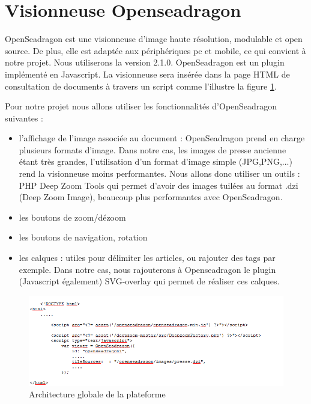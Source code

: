 \newpage
\section{Visionneuse Openseadragon}
\label{sec:seadragon}
OpenSeadragon est une visionneuse d’image haute résolution, modulable et open source. De plus, elle est adaptée aux périphériques pc et mobile, ce qui convient à notre projet. Nous utiliserons la version 2.1.0. OpenSeadragon est un plugin implémenté en Javascript. La visionneuse sera insérée dans la page HTML de consultation de documents à travers un script comme l'illustre la figure \ref{seadragon}. 

Pour notre projet nous allons utiliser les fonctionnalités d'OpenSeadragon suivantes : 
\begin{itemize}
	\item l'affichage de l'image associée au document : OpenSeadragon prend en charge plusieurs formats d'image. Dans notre cas, les images de presse ancienne étant très grandes, l'utilisation d'un format d'image simple (JPG,PNG,...) rend la visionneuse moins performantes. Nous allons donc utiliser un outils : PHP Deep Zoom Tools qui permet d'avoir des images tuilées au format .dzi (Deep Zoom Image), beaucoup plus performantes avec OpenSeadragon.
	\item les boutons de zoom/dézoom 
	\item les boutons de navigation, rotation
	\item les calques : utiles pour délimiter les articles, ou rajouter des tags par exemple. Dans notre cas, nous rajouterons à Openseadragon le plugin (Javascript également) SVG-overlay qui permet de réaliser ces calques.
	\end{itemize}
	
	  \begin{figure}[H]
        \centering
        \includegraphics[width=\textwidth]{figure/osd.png}
            \caption{Architecture globale de la plateforme}
            \label{seadragon}
    \end{figure}
	
	





